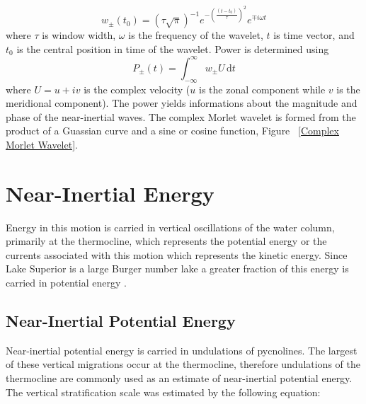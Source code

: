\begin{equation}
	w_{\pm}(t_0)=(\tau \sqrt{\pi})^{-1} e^{-(\frac{(t-t_0)}{\tau})^2}e^{\mp i\omega t}
\end{equation}
where $\tau$ is window width, $\omega$ is the frequency of the wavelet, $t$ is time vector, and $t_0$ is the central position in time of the wavelet.  Power is determined using 
\begin{equation}
	P_{\pm}(t)=\int_{-\infty}^{\infty} \! w_{\pm}U \, \mathrm{d}t
\end{equation}
where $U=u+iv$ is the complex velocity ($u$ is the zonal component while $v$ is the meridional component). The power yields informations about the magnitude and phase 
of the near-inertial waves. The complex Morlet wavelet is formed from the product of a Guassian curve and a sine or cosine function, Figure ~\ref{Complex Morlet Wavelet}.



\section{Near-Inertial Energy}
Energy in this motion is carried in vertical oscillations of the water column, primarily at the thermocline, which represents the potential energy
or the currents associated with this motion which represents the kinetic energy. Since Lake Superior is a large Burger number lake a greater
fraction of this energy is carried in potential energy  \citep{antenucci2001energetics}. 

\subsection{Near-Inertial Potential Energy}

Near-inertial potential energy is carried in undulations of pycnolines. The largest of these vertical migrations occur
at the thermocline, therefore undulations of the thermocline are commonly used as an estimate of near-inertial potential energy.
The vertical stratification scale  was estimated by the following equation:

